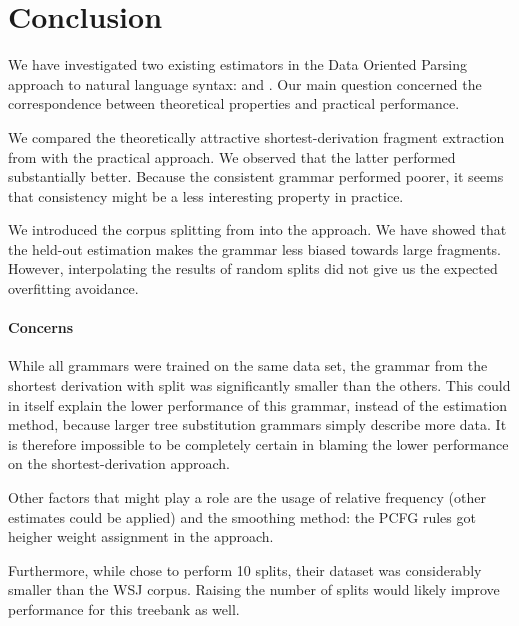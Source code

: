 \section{Conclusion}

We have investigated two existing estimators in the Data Oriented Parsing approach to natural language syntax: \ddop{} and \dops. Our main question concerned the correspondence between theoretical properties and practical performance. 

We compared the theoretically attractive shortest-derivation fragment extraction from \dops{} with the practical \ddop{} approach. 
We observed that the latter performed substantially better. Because the consistent grammar performed poorer, it seems that consistency might be a less interesting property in practice.

We introduced the corpus splitting from \dops{} into the \ddop{} approach.  We have showed that the held-out estimation makes the grammar less biased towards large fragments. However, interpolating the results of random splits did not give us the expected overfitting avoidance. 

\paragraph{Concerns}
While all grammars were trained on the same data set, the grammar from the shortest derivation with split was significantly smaller than the others. This could in itself explain the lower performance of this grammar, instead of the estimation method, because larger tree substitution grammars simply describe more data. It is therefore impossible to be completely certain in blaming the lower performance on the shortest-derivation approach. 

Other factors that might play a role are the usage of relative frequency (other estimates could be applied) and the smoothing method: the PCFG rules got heigher weight assignment in the \ddop{} approach.

Furthermore, while \cite{zollmann2005} chose to perform 10 splits, their dataset was considerably smaller than the WSJ corpus. Raising the number of splits would likely improve performance for this treebank as well.

